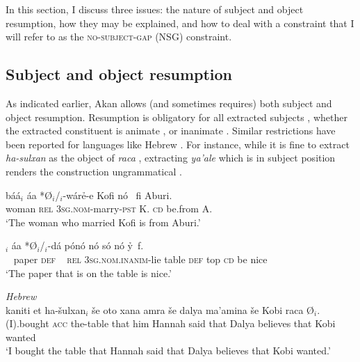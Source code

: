 \documentclass[output=paper]{LSP/langsci}
\begin{document}
  
    
  In this section, I discuss three issues: the nature of subject and object resumption, how they may be explained, and how to deal with a constraint that I will refer to as the \textsc{no-subject-gap} (NSG) constraint.  
  
\subsection{Subject and object resumption}\label{sec:korsah:2.1}

 
As indicated earlier, Akan allows (and sometimes requires) both subject and object  resumption. Resumption is obligatory for all extracted subjects , whether the extracted constituent is animate , or inanimate .  Similar restrictions have been reported  for languages like Hebrew \citep{RnS07}. For instance, while it is fine to extract \textit{ha-sulxan} as the object of  \textit{raca} , extracting  \textit{ya'ale} which is in subject position renders the construction ungrammatical .
 
\ea\label{ex:korsah:4} 
\ea\label{ex:korsah:4a}
\gll\scalebox{1.5}{\oor}b{\'{a}}{\'{a}}$_i$  {\'{a}}a   *\O $_i$/\oor$_i$-w{\'{a}}r\h e-e  Kofi n{\'{o}} \ fi Aburi.\\
woman \textsc{rel} \textsc{3sg.nom}-marry-\textsc{pst} K. \textsc{cd} be.from A. \\
\glt  `The woman who married Kofi is from Aburi.'\hfill   \citep[92]{Saah10}

\ex \label{ex:korsah:4b}
\gll [ K{\'{r}}ata{\'{a}} n{\'{o}} ]$_i$  {\'{a}}a  *\O $_i$/\eer$_i$-d{\'{a}} p{\'{o}}n{\'{o}} n{\'{o}} s{\'{o}}  n{\'{o}} y\h \eer \, f\eer.\\
 ~ paper  \textsc{def} ~  \textsc{rel} \textsc{3sg.nom.inanim}-lie table \textsc{def} top \textsc{cd} be nice \\
\glt  `The paper that is on the table is nice.'
\z
\z
 

\ea\label{ex:korsah:5} \textit{Hebrew}   \citep[120-121]{RnS07}\\
\ea\label{ex:korsah:5a}
\gll kaniti et ha-\v sulxan$_i$ \v se oto xana amra \v se dalya ma'amina \v se Kobi raca \O$_i$.\\
(I).bought \textsc{acc} the-table that him Hannah said that Dalya believes that Kobi wanted \\
\glt  `I bought the table that Hannah said that Dalya believes that Kobi wanted.'
\end{document}
